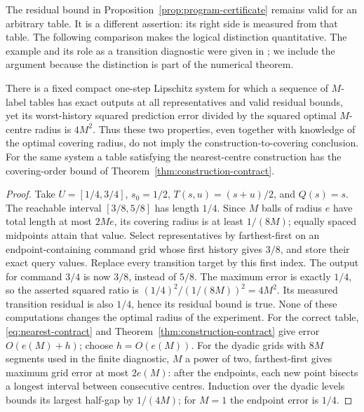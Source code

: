 The residual bound in Proposition~\ref{prop:program-certificate} remains
valid for an arbitrary table. It is a different assertion: its right
side is measured from that table. The following comparison makes the
logical distinction quantitative. The example and its role as a
transition diagnostic were given in \cite{RefereeV11Note}; we include
the argument because the distinction is part of the numerical theorem.

\begin{proposition}
\label{prop:residual-comparison}
There is a fixed compact one-step Lipschitz system for which a sequence
of $M$-label tables has exact outputs at all representatives and valid
residual bounds, yet its worst-history squared prediction error divided
by the squared optimal $M$-centre radius is $4M^2$. Thus these two
properties, even together with knowledge of the optimal covering radius,
do not imply the construction-to-covering conclusion. For the same
system a table satisfying the nearest-centre construction has the
covering-order bound of Theorem~\ref{thm:construction-contract}.
\end{proposition}
\begin{proof}
Take $U=[1/4,3/4]$, $s_0=1/2$, $T(s,u)=(s+u)/2$, and $Q(s)=s$.
The reachable interval $[3/8,5/8]$ has length $1/4$. Since $M$ balls
of radius $e$ have total length at most $2Me$, its covering radius
is at least $1/(8M)$; equally spaced midpoints attain that value.
Select representatives by farthest-first on an endpoint-containing
command grid whose first history gives $3/8$, and store their exact
query values. Replace every transition target by this first index.
The output for command $3/4$ is now $3/8$, instead of $5/8$.
The maximum error is exactly $1/4$, so the asserted squared ratio is
$(1/4)^2/(1/(8M))^2=4M^2$. Its measured transition residual is also
$1/4$, hence its residual bound is true. None of these computations
changes the optimal radius of the experiment. For the correct table,
\eqref{eq:nearest-contract} and Theorem~\ref{thm:construction-contract}
give error $O(e(M)+h)$; choose $h=O(e(M))$. For the dyadic grids with
$8M$ segments used in the finite diagnostic, $M$ a power of two,
farthest-first gives maximum grid error at most $2e(M)$: after the
endpoints, each new point bisects a longest interval between consecutive
centres. Induction over the dyadic levels bounds its largest half-gap
by $1/(4M)$; for $M=1$ the endpoint error is $1/4$.
\end{proof}

